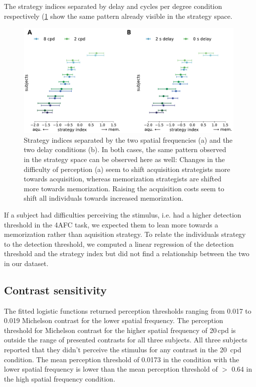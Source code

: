 The strategy indices separated by delay and cycles per degree condition respectively (\ref{fig:strategy_index_cpd} show the same pattern already visible in the strategy space.

\begin{figure}[H]
    \centering
    \includegraphics[width=\textwidth]{Figures/stratidx_cpd4.pdf}
    \caption[Strategy index by spatial frequency and delay]{Strategy indices separated by the two spatial frequencies (a) and the two delay conditions (b). In both cases, the same pattern observed in the strategy space can be observed here as well: Changes in the difficulty of perception (a) seem to shift acquisition strategists more towards acquisition, whereas memorization strategists are shifted more towards memorization. Raising the acquisition costs seem to shift all individuals towards increased memorization.}
    \label{fig:strategy_index_cpd}
\end{figure}

If a subject had difficulties perceiving the stimulus, i.e. had a higher detection threshold in the 4AFC task, we expected them to lean more towards a memorization rather than aquisition strategy. 
To relate the individuals strategy to the detection threshold, we computed a linear regression of the detection threshold and the strategy index but did not find a relationship between the two in our dataset.

\vspace{5mm}
\subsection{Contrast sensitivity}

The fitted logistic functions returned perception thresholds ranging from 0.017 to 0.019 Michelson contrast for the lower spatial frequency. The perception threshold for Michelson contrast for the higher spatial frequency of 20\,cpd is outside the range of presented contrasts for all three subjects. All three subjects reported that they didn't perceive the stimulus  for any contrast in the 20\, cpd condition. The mean perception threshold of 0.0173 in the condition with the lower spatial frequency is lower than the mean perception threshold of $>$ 0.64 in the high spatial frequency condition. 

